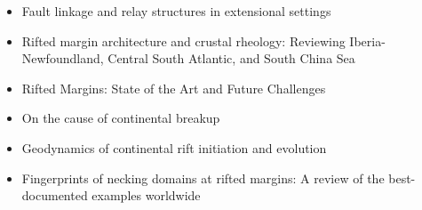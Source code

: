    \begin{itemize}
   \item [\twothousandsixteen] Fault linkage and relay structures in extensional settings \cite{foro16}
   \item [\twothousandseventeen] Rifted margin architecture and crustal rheology: Reviewing 
                Iberia-Newfoundland, Central South Atlantic, and South China Sea \cite{brhc17}
   \item [\twothousandnineteen] Rifted Margins: State of the Art and Future Challenges \cite{pema19}
   \item [\twothousandtwenty] On the cause of continental breakup \cite{niu20}
   \item [\twothousandtwentythree] Geodynamics of continental rift initiation and evolution \cite{brko23}
   \item [\twothousandtwentyfive] Fingerprints of necking domains at rifted margins: A review of the best-documented examples worldwide \cite{chma25}
   \end{itemize}

